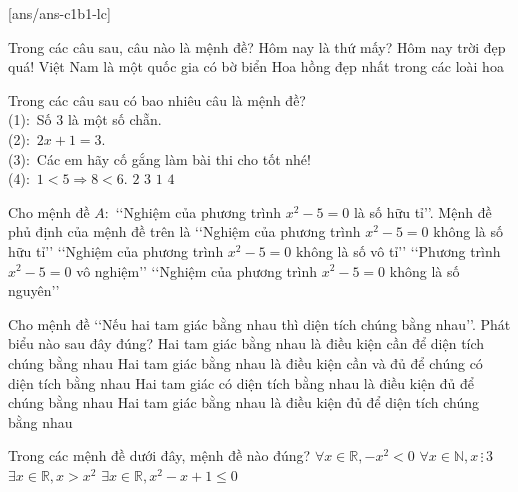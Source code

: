 \baitaptn
\TN
\setcounter{ex}{0}
[ans/ans-c1b1-lc]
\begin{ex}%
	Trong các câu sau, câu nào là mệnh đề?
	\choice
	{Hôm nay là thứ mấy?}
	{Hôm nay trời đẹp quá!}
	{\True Việt Nam là một quốc gia có bờ biển}
	{Hoa hồng đẹp nhất trong các loài hoa}
\end{ex}
\begin{ex}%
	Trong các câu sau có bao nhiêu câu là mệnh đề?\\
	(1)$\colon$ Số $3$ là một số chẵn.\\
	(2)$\colon$ $2x+1=3$.\\
	(3)$\colon$ Các em hãy cố gắng làm bài thi cho tốt nhé!\\
	(4)$\colon$ $1<5\Rightarrow 8<6$.
	\choice
	{\True$2$}
	{$3$}
	{$1$}
	{$4$}
\end{ex}
\begin{ex}%
	Cho mệnh đề $A\colon$ \lq\lq Nghiệm của phương trình $x^2-5=0$ là số hữu tỉ\rq\rq. Mệnh đề phủ định của mệnh đề trên là
	\choice
	{\True \lq\lq Nghiệm của phương trình $x^2-5=0$ không là số hữu tỉ\rq\rq}
	{\lq\lq Nghiệm của phương trình $x^2-5=0$ không là số vô tỉ\rq\rq}
	{\lq\lq Phương trình $x^2-5=0$ vô nghiệm\rq\rq}
	{\lq\lq Nghiệm của phương trình $x^2-5=0$ không là số nguyên\rq\rq}
\end{ex}
\begin{ex}%
	Cho mệnh đề \lq\lq Nếu hai tam giác bằng nhau thì diện tích chúng bằng nhau\rq\rq. Phát biểu nào sau đây đúng?
	\choice
	{Hai tam giác bằng nhau là điều kiện cần để diện tích chúng bằng nhau}
	{Hai tam giác bằng nhau là điều kiện cần và đủ để chúng có diện tích bằng nhau}
	{Hai tam giác có diện tích bằng nhau là điều kiện đủ để chúng bằng nhau}
	{\True Hai tam giác bằng nhau là điều kiện đủ để diện tích chúng bằng nhau}
\end{ex}
\begin{ex}%
	Trong các mệnh đề dưới đây, mệnh đề nào đúng?
	\choice
	{$\forall x \in \mathbb{R},-x^2<0$}
	{$\forall x \in \mathbb{N}, x\,\vdots\,3$}
	{\True $\exists x \in \mathbb{R}, x>x^2$}
	{$\exists x \in \mathbb{R}, x^2-x+1 \leq 0$}
\end{ex}
